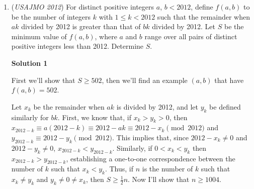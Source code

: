 \begin{enumerate}
 Suppose the latter fails, i.e. $\{n\alpha\} \ge \{a\alpha\}$. Then suppose $n\alpha = m_1 + r_1$ and $a\alpha = m_2 + r_2$, where $m_1$, $m_2$ are integers and $0< r_2\le r_1 <1$ ($r_2$ is not zero because $a\alpha$ is irrational). We now have 
 \[\{0-n\alpha\} = \{-m_1-1 + (1 -r_1)\}=1-r_1\] and 
 \[\{a\alpha -n\alpha\} = \{m_2-m_1-1 + (1+r_2-r_1)\} = 1+r_2-r_1>1-r_1\]

 Therefore $P_0$ is either closer to $P_n$ than $P_a$ on the $P_a$ side, or closer to $P_n$ than $P_b$ on the $P_b$ side. In other words, $P_1$ is the closest adjacent point of $P_{n+1}$ on the $P_{a+1}$ side, or the closest adjacent point of $P_{n+1}$ on the $P_{b+1}$ side. Hence $P_c$ or $P_d$ is $P_1$, therefore $c+d \le n+1$.

 (ii) Suppose $a+b\le n-1$Then either $c+d = (a+1)+(b+1) \le n+1$ when $c=a+1$ and $d=b+1$, or $c+d \le 1+n$ when one of $P_c$ or $P_d$ is $P_1$.

 In either case, $c+d\le n+1$ is true.

 --\href{https://artofproblemsolving.com/wiki/index.php?title=User:Lightest}{Lightest} 20:27, 6 May 2012 (EDT)

 


	\item (\textit{USAJMO 2012}) For distinct positive integers $a$, $b < 2012$, define $f(a,b)$ to be the number of integers $k$ with $1 \le k < 2012$ such that the remainder when $ak$ divided by 2012 is greater than that of $bk$ divided by 2012.  Let $S$ be the minimum value of $f(a,b)$, where $a$ and $b$ range over all pairs of distinct positive integers less than 2012.  Determine $S$.


 



\textbf{Solution 1}

First we'll show that $S \geq 502$, then we'll find an example $(a, b)$ that have $f(a, b)=502$.

 Let $x_k$ be the remainder when $ak$ is divided by 2012, and let $y_k$ be defined similarly for $bk$. First, we know that, if $x_k > y_k >0$, then $x_{2012-k} \equiv a(2012-k) \equiv 2012-ak \equiv 2012-x_k \pmod {2012}$ and $y_{2012-k} \equiv 2012-y_k \pmod {2012}$. This implies that, since $2012 - x_k \neq 0$ and $2012 -y_k \neq 0$, $x_{2012-k} < y_{2012-k}$. Similarly, if $0< x_k < y_k$ then $x_{2012-k} > y_{2012-k}$, establishing a one-to-one correspondence between the number of $k$ such that $x_k < y_k$. Thus, if $n$ is the number of $k$ such that $x_k \neq y_k$ and $y_k \neq 0 \neq x_k$, then $S \geq \frac{1}{2}n$. Now I'll show that $n \geq 1004$.


\end{enumerate}
